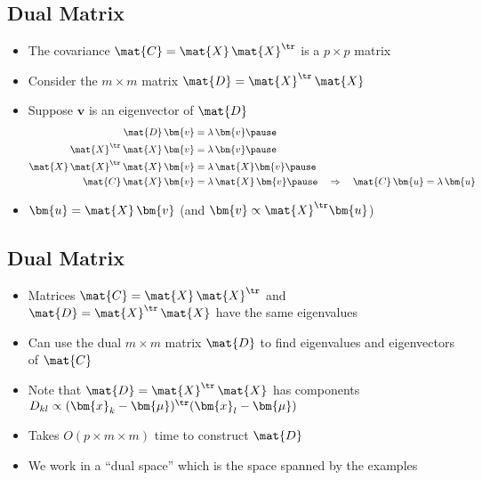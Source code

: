 
\begin{slide}
\section[-2]{Dual Matrix}

\begin{PauseHighLight}
  \begin{itemize}
  \item The covariance $\mat{C} = \mat{X}\,\mat{X}^\tr$ is a $p\times p$
    matrix\pause
  \item Consider the $m\times m$ matrix $\mat{D} =
    \mat{X}^\tr\,\mat{X}$\pause 
  \item Suppose $\bm{v}$ is an eigenvector of $\mat{D}$
    \begin{align*}
      \mat{D}\, \bm{v} &= \lambda\, \bm{v}\pause
      \\
      \mat{X}^\tr\,\mat{X}\,\bm{v} &= \lambda\, \bm{v}\pause
      \\
      \mat{X} \, \mat{X}^\tr\,\mat{X}\,\bm{v} &= \lambda\, \mat{X}
      \bm{v}\pause
      \\
      \mat{C}\,\mat{X}\,\bm{v} &= \lambda\, \mat{X}\,\bm{v}\pause 
                                 \quad \Rightarrow
      \quad \mat{C} \,\bm{u} = \lambda \, \bm{u}
    \end{align*}
  \item $\bm{u} = \mat{X}\,\bm{v}$\pause{} (and $\bm{v} \propto
    \mat{X}^\tr \bm{u}$)\pauseb
  \end{itemize}
\end{PauseHighLight}

\end{slide}


\begin{slide}
\section{Dual Matrix}

\begin{PauseHighLight}
  \begin{itemize}
  \item Matrices $\mat{C} = \mat{X}\,\mat{X}^\tr$ and $\mat{D} =
    \mat{X}^\tr\,\mat{X}$ have the same eigenvalues\pause
  \item Can use the dual $m\times m$ matrix $\mat{D}$ to find eigenvalues
    and eigenvectors of $\mat{C}$\pause
  \item Note that $\mat{D} = \mat{X}^\tr\,\mat{X}$ has components
    $D_{kl} \propto (\bm{x}_k -\bm{\mu})^\tr (\bm{x}_l -\bm{\mu})$\pause
  \item Takes $O(p\times m \times m)$ time to construct $\mat{D}$\pause
  \item We work in a ``dual space'' which is the space spanned by the examples\pause
  \end{itemize}
\end{PauseHighLight}

\end{slide}

